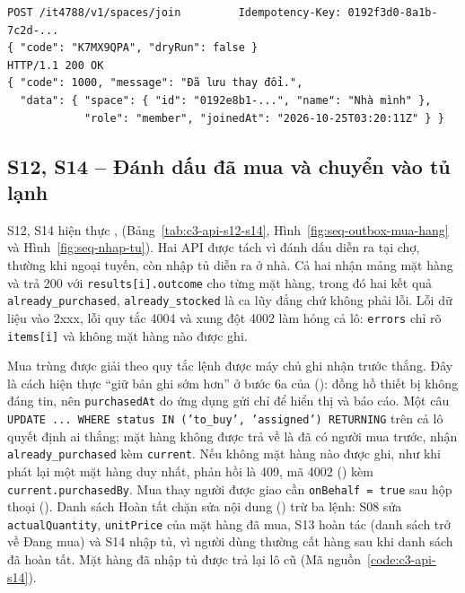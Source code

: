\apiNeed{3.4cm}
\begin{Verbatim}[fontsize=\scriptsize]
POST /it4788/v1/spaces/join         Idempotency-Key: 0192f3d0-8a1b-7c2d-...
{ "code": "K7MX9QPA", "dryRun": false }
HTTP/1.1 200 OK
{ "code": 1000, "message": "Đã lưu thay đổi.",
  "data": { "space": { "id": "0192e8b1-...", "name": "Nhà mình" },
            "role": "member", "joinedAt": "2026-10-25T03:20:11Z" } }
\end{Verbatim}

\subsection{S12, S14 – Đánh dấu đã mua và chuyển vào tủ lạnh}\label{sssec:api-s12-s14}

S12, S14 hiện thực ,  (Bảng~\ref{tab:c3-api-s12-s14}, Hình~\ref{fig:seq-outbox-mua-hang} và Hình~\ref{fig:seq-nhap-tu}). Hai API được tách vì đánh dấu diễn ra tại chợ, thường khi ngoại tuyến, còn nhập tủ diễn ra ở nhà. Cả hai nhận mảng mặt hàng và trả 200 với \texttt{results[i].outcome} cho từng mặt hàng, trong đó hai kết quả \texttt{already\_purchased}, \texttt{already\_stocked} là ca lũy đẳng chứ không phải lỗi. Lỗi dữ liệu vào 2xxx, lỗi quy tắc 4004 và xung đột 4002 làm hỏng cả lô: \texttt{errors} chỉ rõ \texttt{items[i]} và không mặt hàng nào được ghi.

Mua trùng được giải theo quy tắc lệnh được máy chủ ghi nhận trước thắng. Đây là cách hiện thực “giữ bản ghi sớm hơn” ở bước 6a của  (): đồng hồ thiết bị không đáng tin, nên \texttt{purchasedAt} do ứng dụng gửi chỉ để hiển thị và báo cáo. Một câu \texttt{UPDATE ... WHERE status IN ('to\_buy', 'assigned') RETURNING} trên cả lô quyết định ai thắng; mặt hàng không được trả về là đã có người mua trước, nhận \texttt{already\_purchased} kèm \texttt{current}. Nếu không mặt hàng nào được ghi, như khi phát lại một mặt hàng duy nhất, phản hồi là 409, mã 4002 () kèm \texttt{current.purchasedBy}. Mua thay người được giao cần \texttt{onBehalf = true} sau hộp thoại  (). Danh sách Hoàn tất chặn sửa nội dung () trừ ba lệnh: S08 sửa \texttt{actualQuantity}, \texttt{unitPrice} của mặt hàng đã mua, S13 hoàn tác (danh sách trở về Đang mua) và S14 nhập tủ, vì người dùng thường cất hàng sau khi danh sách đã hoàn tất. Mặt hàng đã nhập tủ được trả lại lô cũ (Mã nguồn~\ref{code:c3-api-s14}).

